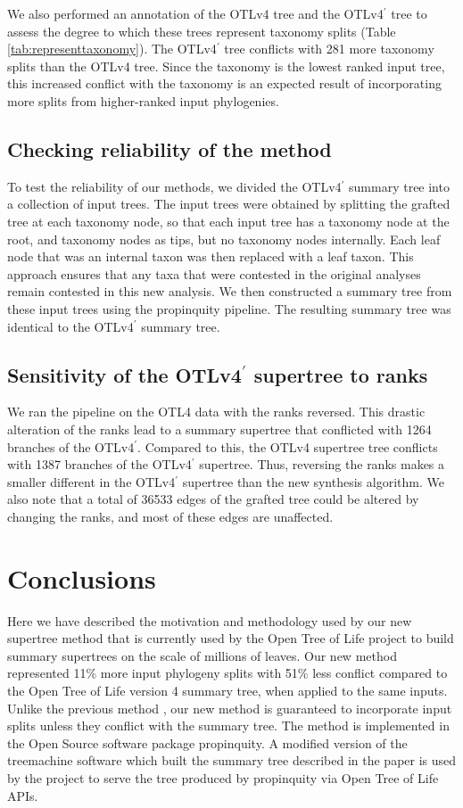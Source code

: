 \documentclass[fleqn,12pt,lineno,english]{wlpeerj}
\newcommand{\otl}{OTLv4}
\newcommand{\otlprop}{OTLv4$^\prime$}
\begin{document}
We also performed an annotation of the \otl{} tree and the \otlprop{}
tree to assess the degree to which these trees represent taxonomy
splits (Table \ref{tab:representtaxonomy}).  The \otlprop{} tree
conflicts with 281 more taxonomy splits than the \otl{} tree.  Since
the taxonomy is the lowest ranked input tree, this increased conflict
with the taxonomy is an expected result of incorporating more splits
from higher-ranked input phylogenies.  

\subsection{Checking reliability of the method}
To test the reliability of our methods, we divided the \otlprop{} summary
tree into a collection of input trees. The input trees were obtained
by splitting the grafted tree at each taxonomy node, so that each
input tree has a taxonomy node at the root, and taxonomy nodes as
tips, but no taxonomy nodes internally.  Each leaf node that was an
internal taxon was then replaced with a leaf taxon. This approach
ensures that any taxa that were contested in the original analyses
remain contested in this new analysis.  We then constructed a summary
tree from these input trees using the propinquity pipeline.  The
resulting summary tree was identical to the \otlprop{} summary tree.

\subsection{Sensitivity of the \otlprop{} supertree to ranks}
We ran the pipeline on the OTL4 data with the ranks reversed.  This drastic alteration of the ranks lead to a summary supertree that conflicted with 1264 branches of the \otlprop{}.  Compared to this, the \otl{} supertree tree conflicts with 1387 branches of the \otlprop{} supertree.  Thus, reversing the ranks makes a smaller different in the \otlprop{} supertree than the new synthesis algorithm.  We also note that a total of 36533 edges of the grafted tree could be altered by changing the ranks, and most of these edges are unaffected.

\section{Conclusions}

Here we have described the motivation and methodology used by our new
supertree method that is currently used by the Open Tree of Life
project to build summary supertrees on the scale of millions of leaves.
Our new method represented 11\% more input phylogeny splits with 51\%
less conflict compared to the Open Tree of Life version 4 summary
tree, when applied to the same inputs. Unlike the previous method
\citep{HinchliffEtAl2015}, our new method is guaranteed to incorporate
input splits unless they conflict with the summary tree. The method is
implemented in the Open Source software package propinquity.  A
modified version of the treemachine software which built the summary
tree described in the \citet{HinchliffEtAl2015} paper is used by the
project to serve the tree produced by propinquity via Open Tree of
Life APIs.
\end{document}
